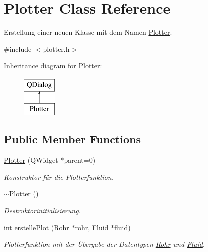 \hypertarget{class_plotter}{}\section{Plotter Class Reference}
\label{class_plotter}


Erstellung einer neuen Klasse mit dem Namen \hyperlink{class_plotter}{Plotter}.  




{\ttfamily \#include $<$plotter.\+h$>$}

Inheritance diagram for Plotter\+:\begin{figure}[H]
\begin{center}
\leavevmode
\includegraphics[height=2.000000cm]{class_plotter}
\end{center}
\end{figure}
\subsection*{Public Member Functions}
\begin{DoxyCompactItemize}
\item 
\hyperlink{class_plotter_a367b6890c36910a27ec710ac3693e64b}{Plotter} (Q\+Widget $\ast$parent=0)
\begin{DoxyCompactList}\small\item\em Konstruktor für die Plotterfunktion. \end{DoxyCompactList}\item 
\hyperlink{class_plotter_acd0883f9597a6b3bfcca0fce926809a0}{$\sim$\+Plotter} ()
\begin{DoxyCompactList}\small\item\em Destruktorinitialisierung. \end{DoxyCompactList}\item 
int \hyperlink{class_plotter_a4808217f2ec95082cee4c239b707fcc3}{erstelle\+Plot} (\hyperlink{class_rohr}{Rohr} $\ast$rohr, \hyperlink{class_fluid}{Fluid} $\ast$fluid)
\begin{DoxyCompactList}\small\item\em Plotterfunktion mit der Übergabe der Datentypen \hyperlink{class_rohr}{Rohr} und \hyperlink{class_fluid}{Fluid}. \end{DoxyCompactList}\end{DoxyCompactItemize}


